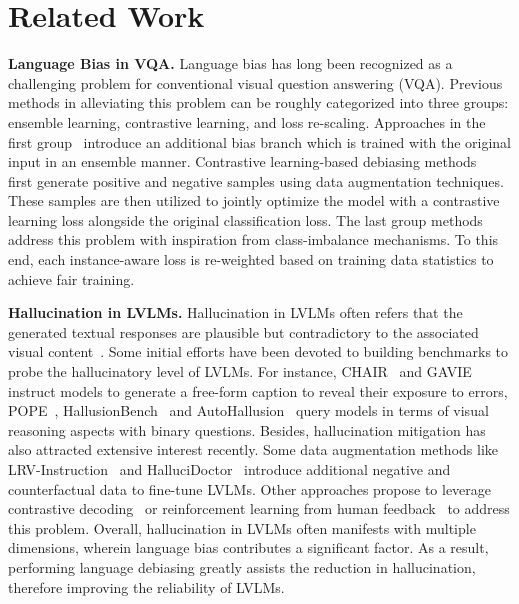 \section{Related Work}
\noindent \textbf{Language Bias in VQA.} Language bias has long been recognized as a challenging problem for conventional visual question answering (VQA). Previous methods in alleviating this problem can be roughly categorized into three groups: ensemble learning, contrastive learning, and loss re-scaling. Approaches in the first group~\cite{cadene2019rubi:rubi,clark2019don} introduce an additional bias branch which is trained with the original input in an ensemble manner. Contrastive learning-based debiasing methods~\cite{liang2020learning:97,si2022towards:137} first generate positive and negative samples using data augmentation techniques. These samples are then utilized to jointly optimize the model with a contrastive learning loss alongside the original classification loss. The last group methods~\cite{ijcai2021p98:ijcai,wu2019self:scr} address this problem with inspiration from class-imbalance mechanisms. To this end, each instance-aware loss is re-weighted based on training data statistics to achieve fair training. 

\noindent \textbf{Hallucination in LVLMs.}
Hallucination in LVLMs often refers that the generated textual responses are plausible but contradictory to the associated visual content~\cite{zhou2023analyzing:137,calibrated2024}. Some initial efforts have been devoted to building benchmarks to probe the hallucinatory level of LVLMs. For instance, CHAIR~\cite{rohrbach2018object:chairs} and GAVIE~\cite{liu2023mitigating:lrv} instruct models to generate a free-form caption to reveal their exposure to errors, POPE~\cite{li2023evaluating:pope}, HallusionBench~\cite{guan2024hallusionbench} and AutoHallusion~\cite{wu2024autohallusion} query models in terms of visual reasoning aspects with binary questions. Besides, hallucination mitigation has also attracted extensive interest recently. Some data augmentation methods like LRV-Instruction~\cite{liu2023mitigating:lrv} and HalluciDoctor~\cite{yu2024hallucidoctor} introduce additional negative and counterfactual data to fine-tune LVLMs. Other approaches propose to leverage contrastive decoding~\cite{leng2024mitigating:vcd,liu2024paying:pai,code2024} or reinforcement learning from human feedback~\cite{gunjal2024detecting:HalDetect,yu2024rlhf} to address this problem.
Overall, hallucination in LVLMs often manifests with multiple dimensions, wherein language bias contributes a significant factor.
As a result, performing language debiasing greatly assists the reduction in hallucination, therefore improving the reliability of LVLMs.

